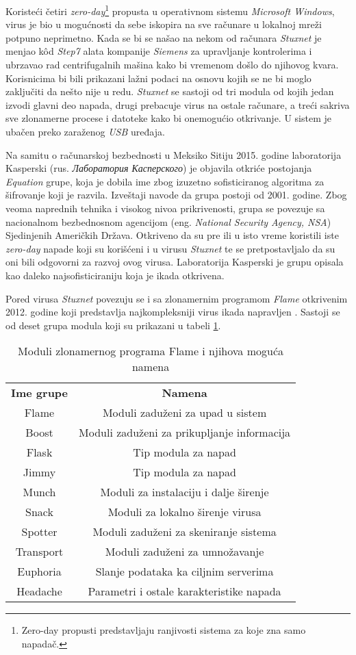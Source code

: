 \documentclass[a4paper]{article}
\begin{document}
Koristeći četiri \textit{zero-day}\footnote{Zero-day propusti predstavljaju ranjivosti sistema za koje zna samo napadač.} propusta u operativnom sistemu \textit{Microsoft Windows}, virus je bio u mogućnosti da sebe iskopira na sve računare u lokalnoj mreži potpuno neprimetno. Kada se bi se našao na nekom od računara \textit{Stuxnet} je menjao kôd \textit{Step7} alata kompanije \textit{Siemens} za upravljanje kontrolerima i ubrzavao rad centrifugalnih mašina kako bi vremenom došlo do njihovog kvara. Korisnicima bi bili prikazani lažni podaci na osnovu kojih se ne bi moglo zaključiti da nešto nije u redu. \textit{Stuxnet} se sastoji od tri modula od kojih jedan izvodi glavni deo napada, drugi prebacuje virus na ostale računare, a treći sakriva sve zlonamerne procese i datoteke kako bi onemogućio otkrivanje. U sistem je ubačen preko zaraženog \textit{USB} uređaja.

Na samitu o računarskoj bezbednosti u Meksiko Sitiju 2015. godine laboratorija Kasperski (rus. \textit{Лаборатория Касперского}) je objavila otkriće postojanja \textit{Equation} grupe, koja je dobila ime zbog izuzetno sofisticiranog algoritma za šifrovanje koji je razvila. Izveštaji navode da grupa postoji od 2001. godine. Zbog veoma naprednih tehnika i visokog nivoa prikrivenosti, grupa se povezuje sa nacionalnom bezbednosnom agencijom (eng. \textit{National Security Agency, NSA}) Sjedinjenih Američkih Država. Otkriveno da su pre ili u isto vreme koristili iste \textit{zero-day} napade koji su korišćeni i u virusu \textit{Stuxnet} te se pretpostavljalo da su oni bili odgovorni za razvoj ovog virusa. Laboratorija Kasperski je grupu opisala kao daleko najsofisticiraniju koja je ikada otkrivena.

Pored virusa \textit{Stuxnet} povezuju se i sa zlonamernim programom \textit{Flame} otkrivenim 2012. godine koji predstavlja najkompleksniji virus ikada napravljen \cite{flame}. Sastoji se od deset grupa modula koji su prikazani u tabeli \ref{table:1}.

\begin{table}[h!]
\centering
\begin{tabular}{||c  c||} 
 \hline
 \textbf{Ime grupe} & \textbf{Namena} \\ 
 Flame & Moduli zaduženi za upad u sistem \\ 
 Boost & Moduli zaduženi za prikupljanje informacija \\
 Flask & Tip modula za napad \\
 Jimmy & Tip modula za napad \\
 Munch & Moduli za instalaciju i dalje širenje \\
 Snack & Moduli za lokalno širenje virusa \\
 Spotter & Moduli zaduženi za skeniranje sistema \\
 Transport & Moduli zaduženi za umnožavanje \\
 Euphoria & Slanje podataka ka ciljnim serverima \\
 Headache & Parametri i ostale karakteristike napada \\ [1ex] 
 \hline
\end{tabular}
\caption{Moduli zlonamernog programa Flame i njihova moguća namena}
\label{table:1}
\end{table}
\end{document}
